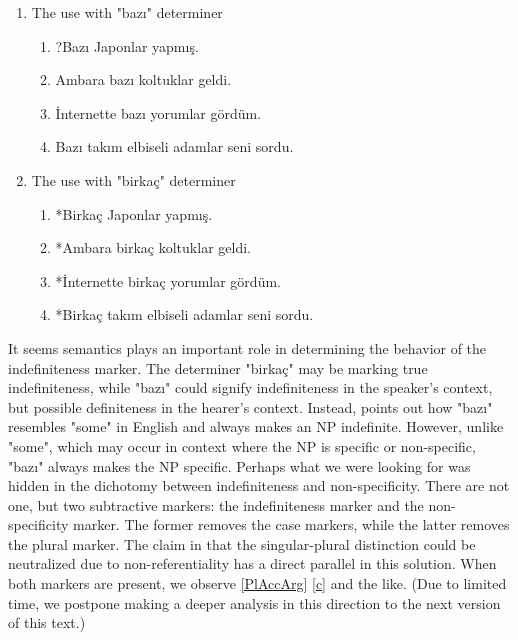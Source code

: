 \documentclass[11pt]{article} %
\begin{document}
\begin{enumerate}[resume*] 
	\item The use with "bazı" determiner
	\begin{enumerate}[label=(\alph*), ref=(\alph*)]\itemsep1pt
	\item ?Bazı Japonlar yapmış. 
	\item Ambara bazı koltuklar geldi. 
	\item İnternette bazı yorumlar gördüm.
	\item Bazı takım elbiseli adamlar seni sordu. 
	\end{enumerate}

	\item The use with "birkaç" determiner
	\begin{enumerate}[label=(\alph*), ref=(\alph*)]\itemsep1pt
	\item *Birkaç Japonlar yapmış. 
	\item *Ambara birkaç koltuklar geldi. 
	\item *İnternette birkaç yorumlar gördüm.
	\item *Birkaç takım elbiseli adamlar seni sordu. 
	\end{enumerate}
\end{enumerate}

It seems semantics plays an important role in determining the behavior of the indefiniteness marker. The determiner "birkaç" may be marking true indefiniteness, while "bazı" could signify indefiniteness in the speaker's context, but possible definiteness in the hearer's context. Instead, \citet{Bliss2004} points out how "bazı" resembles "some" in English and always makes an NP indefinite. However, unlike "some", which may occur in context where the NP is specific or non-specific, "bazı" always makes the NP specific. Perhaps what we were looking for was hidden in the dichotomy between indefiniteness and non-specificity. There are not one, but two subtractive markers: the indefiniteness marker and the non-specificity marker. The former removes the case markers, while the latter removes the plural marker. The claim in \citet{Tura1986} that the singular-plural distinction could be neutralized due to non-referentiality has a direct parallel in this solution. When both markers are present, we observe \ref{PlAccArg} \ref{c} and the like. (Due to limited time, we postpone making a deeper analysis in this direction to the next version of this text.) \\ 

\end{document}
